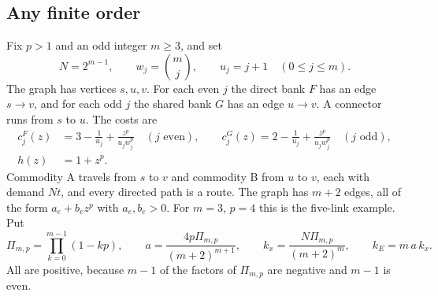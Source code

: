 \subsection{Any finite order}\label{sec:family}

Fix $p>1$ and an odd integer $m\ge3$, and set
\begin{equation}\label{eq:parameters}
 N=2^{m-1},\qquad w_j=\binom mj,\qquad u_j=j+1\quad(0\le j\le m).
\end{equation}
The graph has vertices $s,u,v$. For each even $j$ the direct bank $F$ has an edge $s\to v$, and for each odd $j$ the shared bank $G$ has an edge $u\to v$. A connector runs from $s$ to $u$. The costs are
\begin{align}
 c_j^F(z)&=3-\frac1{u_j}+\frac{z^p}{u_jw_j^p}\quad(j\text{ even}),\qquad
 c_j^G(z)=2-\frac1{u_j}+\frac{z^p}{u_jw_j^p}\quad(j\text{ odd}),\label{eq:FGcost}\\
 h(z)&=1+z^p.\label{eq:hcost}
\end{align}
Commodity A travels from $s$ to $v$ and commodity B from $u$ to $v$, each with demand $Nt$, and every directed path is a route. The graph has $m+2$ edges, all of the form $a_e+b_ez^p$ with $a_e,b_e>0$. For $m=3$, $p=4$ this is the five-link example. Put
\begin{equation}\label{eq:constants}
 \Pi_{m,p}=\prod_{k=0}^{m-1}(1-kp),\qquad
 a=\frac{4p\Pi_{m,p}}{(m+2)^{m+1}},\qquad
 k_x=\frac{N\Pi_{m,p}}{(m+2)^m},\qquad k_E=m\,a\,k_x.
\end{equation}
All are positive, because $m-1$ of the factors of $\Pi_{m,p}$ are negative and $m-1$ is even.


